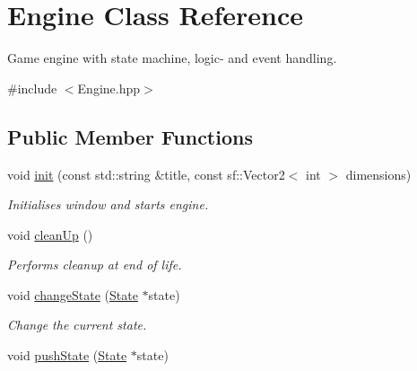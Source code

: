 \hypertarget{class_engine}{\section{Engine Class Reference}
\label{class_engine}
}


Game engine with state machine, logic-\/ and event handling.  




{\ttfamily \#include $<$Engine.\-hpp$>$}

\subsection*{Public Member Functions}
\begin{DoxyCompactItemize}
\item 
\hypertarget{class_engine_a0f9c21ea40811053a338aab4b142461b}{void \hyperlink{class_engine_a0f9c21ea40811053a338aab4b142461b}{init} (const std\-::string \&title, const sf\-::\-Vector2$<$ int $>$ dimensions)}\label{class_engine_a0f9c21ea40811053a338aab4b142461b}

\begin{DoxyCompactList}\small\item\em Initialises window and starts engine. \end{DoxyCompactList}\item 
\hypertarget{class_engine_ae77baba9282f194f49f02cfab00cb9c8}{void \hyperlink{class_engine_ae77baba9282f194f49f02cfab00cb9c8}{clean\-Up} ()}\label{class_engine_ae77baba9282f194f49f02cfab00cb9c8}

\begin{DoxyCompactList}\small\item\em Performs cleanup at end of life. \end{DoxyCompactList}\item 
\hypertarget{class_engine_ae6dbb51c6e1ff5ecd4f4bd1afecd4f11}{void \hyperlink{class_engine_ae6dbb51c6e1ff5ecd4f4bd1afecd4f11}{change\-State} (\hyperlink{class_state}{State} $\ast$state)}\label{class_engine_ae6dbb51c6e1ff5ecd4f4bd1afecd4f11}

\begin{DoxyCompactList}\small\item\em Change the current state. \end{DoxyCompactList}\item 
\hypertarget{class_engine_a8efcd77851c6446bb89047d97293dd80}{void \hyperlink{class_engine_a8efcd77851c6446bb89047d97293dd80}{push\-State} (\hyperlink{class_state}{State} $\ast$state)}\label{class_engine_a8efcd77851c6446bb89047d97293dd80}


\end{DoxyCompactItemize}
